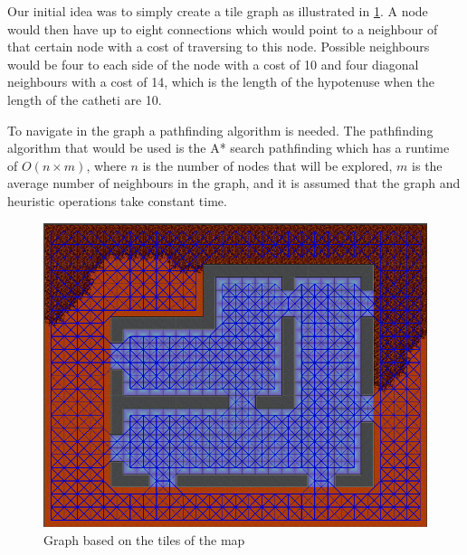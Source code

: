 Our initial idea was to simply create a tile graph\cite{AIG:Millington} as illustrated in \ref{gridGraph}.
A node would then have up to eight connections which would point to a neighbour of that certain node with a cost of traversing to this node.
Possible neighbours would be four to each side of the node with a cost of 10 and four diagonal neighbours with a cost of 14, which is the length of the hypotenuse when the length of the catheti are 10.

To navigate in the graph a pathfinding algorithm is needed. 
The pathfinding algorithm that would be used is the A* search pathfinding which has a runtime of $O(n \times m)$, where $n$ is the number of nodes that will be explored, $m$ is the average number of neighbours in the graph, and it is assumed that the graph and heuristic operations take constant time\cite{AIG:Millington}.

\begin{figure}[h]
	\includegraphics[width=\textwidth]{figures/astar/gridGraph}
	\caption{Graph based on the tiles of the map}
	\label{gridGraph}
\end{figure}

